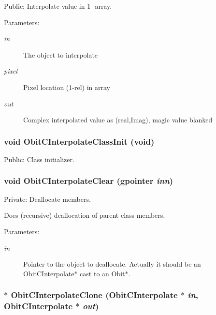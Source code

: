 Public: Interpolate value in 1- array. 

\begin{Desc}
\item[Parameters:]
\begin{description}
\item[{\em in}]The object to interpolate \item[{\em pixel}]Pixel location (1-rel) in array \item[{\em out}]Complex interpolated value as (real,Imag), magic value blanked \end{description}
\end{Desc}
\subsubsection{\setlength{\rightskip}{0pt plus 5cm}void Obit\-CInterpolate\-Class\-Init (void)}\label{ObitCInterpolate_8c_a19}


Public: Class initializer. 

\subsubsection{\setlength{\rightskip}{0pt plus 5cm}void Obit\-CInterpolate\-Clear (gpointer {\em inn})}\label{ObitCInterpolate_8c_a4}


Private: Deallocate members. 

Does (recursive) deallocation of parent class members. \begin{Desc}
\item[Parameters:]
\begin{description}
\item[{\em in}]Pointer to the object to deallocate. Actually it should be an Obit\-CInterpolate$\ast$ cast to an Obit$\ast$. \end{description}
\end{Desc}
\subsubsection{$\ast$ Obit\-CInterpolate\-Clone ({\bf Obit\-CInterpolate} $\ast$ {\em in}, {\bf Obit\-CInterpolate} $\ast$ {\em out})}\label{ObitCInterpolate_8c_a13}


